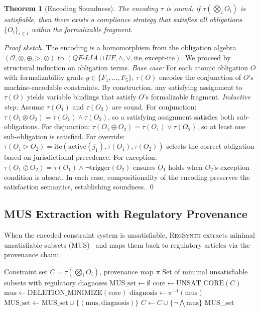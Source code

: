 \documentclass[11pt,twocolumn]{article}
\newtheorem{theorem}{Theorem}
\newcommand{\regsynth}{\textsc{RegSynth}}
\newcommand{\tensor}{\otimes}
\newcommand{\disjunction}{\oplus}
\newcommand{\override}{\triangleright}
\newcommand{\except}{\oslash}
\begin{document}
\begin{theorem}[Encoding Soundness]
\label{thm:soundness}
The encoding $\tau$ is sound: if $\tau(\bigotimes_i O_i)$ is satisfiable, then
there exists a compliance strategy that satisfies all obligations
$\{O_i\}_{i \in I}$ within the formalizable fragment.
\end{theorem}

\emph{Proof sketch.} The encoding is a homomorphism from the obligation algebra
$(\mathcal{O}, \tensor, \disjunction, \override, \except)$ to
$(QF\text{-}LIA \cup UF, \wedge, \vee, \text{ite}, \text{except-ite})$.
We proceed by structural induction on obligation terms.
\emph{Base case:} For each atomic obligation $O$ with formalizability grade
$g \in \{F_1, \ldots, F_5\}$, $\tau(O)$ encodes the conjunction of $O$'s
machine-encodable constraints. By construction, any satisfying assignment to
$\tau(O)$ yields variable bindings that satisfy $O$'s formalizable fragment.
\emph{Inductive step:} Assume $\tau(O_1)$ and $\tau(O_2)$ are sound.
For conjunction: $\tau(O_1 \tensor O_2) = \tau(O_1) \wedge \tau(O_2)$, so a
satisfying assignment satisfies both sub-obligations.
For disjunction: $\tau(O_1 \disjunction O_2) = \tau(O_1) \vee \tau(O_2)$,
so at least one sub-obligation is satisfied.
For override: $\tau(O_1 \override O_2) = \text{ite}(\text{active}(j_1), \tau(O_1), \tau(O_2))$
selects the correct obligation based on jurisdictional precedence.
For exception: $\tau(O_1 \except O_2) = \tau(O_1) \wedge \neg\text{trigger}(O_2)$
ensures $O_1$ holds when $O_2$'s exception condition is absent.
In each case, compositionality of the encoding preserves the satisfaction
semantics, establishing soundness. \qed

\subsection{MUS Extraction with Regulatory Provenance}

When the encoded constraint system is unsatisfiable, \regsynth{} extracts
minimal unsatisfiable subsets (MUS)~\cite{liffiton2008mus} and maps them
back to regulatory articles via the provenance chain:

\begin{algorithm}[t]
\caption{MUS Extraction with Regulatory Provenance}
\label{alg:mus}
\begin{algorithmic}[1]
\Require Constraint set $C = \tau(\bigotimes_i O_i)$, provenance map $\pi$
\Ensure Set of minimal unsatisfiable subsets with regulatory diagnoses
\State $\text{MUS\_set} \gets \emptyset$
  \State $\text{core} \gets \text{UNSAT\_CORE}(C)$ 
  \State $\text{mus} \gets \text{DELETION\_MINIMIZE}(\text{core})$
  \State $\text{diagnosis} \gets \pi^{-1}(\text{mus})$ 
  \State $\text{MUS\_set} \gets \text{MUS\_set} \cup \{(\text{mus}, \text{diagnosis})\}$
  \State $C \gets C \cup \{\neg\bigwedge \text{mus}\}$ 
\EndWhile
\State \Return MUS\_set
\end{algorithmic}
\end{algorithm}
\end{document}
